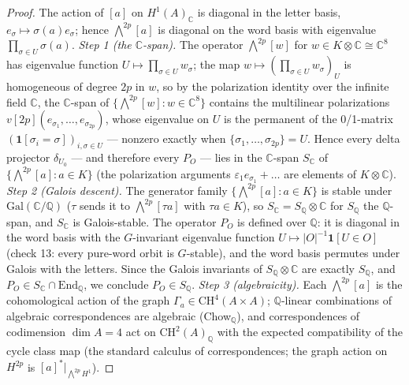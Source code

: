 \documentclass[11pt]{article}
\begin{document}
\begin{proof}
The action of $[a]$ on $H^1(A)_\mathbb{C}$ is diagonal in the letter basis, $e_\sigma \mapsto
\sigma(a) e_\sigma$; hence $\bigwedge^{2p}[a]$ is diagonal on the word basis with eigenvalue
$\prod_{\sigma \in U} \sigma(a)$.  \emph{Step 1 (the $\mathbb{C}$-span).}  The operator
$\bigwedge^{2p}[w]$ for $w \in K \otimes \mathbb{C} \cong \mathbb{C}^8$ has eigenvalue function
$U \mapsto \prod_{\sigma \in U} w_\sigma$; the map $w \mapsto
(\prod_{\sigma\in U} w_\sigma)_U$ is homogeneous of degree $2p$ in $w$, so by the polarization
identity over the infinite field $\mathbb{C}$, the $\mathbb{C}$-span of
$\{\bigwedge^{2p}[w] : w \in \mathbb{C}^8\}$ contains the multilinear polarizations
$v[2p](e_{\sigma_1}, \dots, e_{\sigma_{2p}})$, whose eigenvalue on $U$ is the permanent of the
0/1-matrix $(\mathbf{1}[\sigma_i = \sigma])_{i, \sigma \in U}$ --- nonzero exactly when
$\{\sigma_1, \dots, \sigma_{2p}\} = U$.  Hence every delta projector $\delta_{U_0}$ --- and
therefore every $P_O$ --- lies in the $\mathbb{C}$-span $S_\mathbb{C}$ of
$\{\bigwedge^{2p}[a] : a \in K\}$ (the polarization arguments
$\varepsilon_1 e_{\sigma_1} + \dots$ are elements of $K \otimes \mathbb{C}$).
\emph{Step 2 (Galois descent).}  The generator family $\{\bigwedge^{2p}[a] : a \in K\}$ is
stable under $\mathrm{Gal}(\mathbb{C}/\mathbb{Q})$ ($\tau$ sends it to
$\bigwedge^{2p}[\tau a]$ with $\tau a \in K$), so $S_\mathbb{C} = S_\mathbb{Q} \otimes
\mathbb{C}$ for $S_\mathbb{Q}$ the $\mathbb{Q}$-span, and $S_\mathbb{C}$ is Galois-stable.
The operator $P_O$ is defined over $\mathbb{Q}$: it is diagonal in the word basis with the
$G$-invariant eigenvalue function $U \mapsto |O|^{-1}\mathbf{1}[U \in O]$ (check 13: every
pure-word orbit is $G$-stable), and the word basis permutes under Galois with the letters.
Since the Galois invariants of $S_\mathbb{Q} \otimes \mathbb{C}$ are exactly $S_\mathbb{Q}$, and
$P_O \in S_\mathbb{C} \cap \mathrm{End}_\mathbb{Q}$, we conclude $P_O \in S_\mathbb{Q}$.
\emph{Step 3 (algebraicity).}  Each $\bigwedge^{2p}[a]$ is the cohomological action of the graph
$\Gamma_a \in \mathrm{CH}^{4}(A\times A)$; $\mathbb{Q}$-linear combinations of algebraic
correspondences are algebraic (Chow$_\mathbb{Q}$), and correspondences of codimension
$\dim A = 4$ act on $\mathrm{CH}^2(A)_\mathbb{Q}$ with the expected compatibility of the cycle
class map (the standard calculus of correspondences; the graph action on $H^{2p}$ is
$[a]^*|_{\bigwedge^{2p} H^1}$).
\end{proof}
\end{document}
